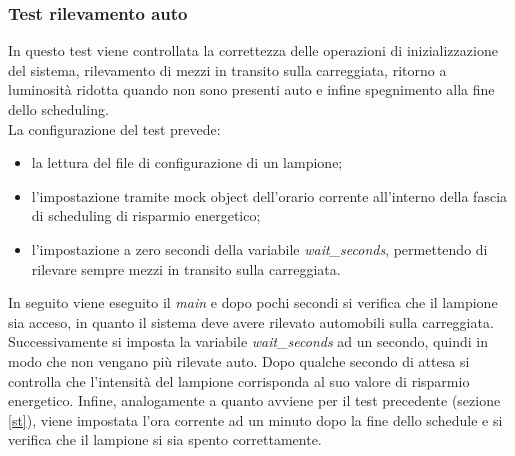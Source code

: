 \subsubsection{Test rilevamento auto}
In questo test viene controllata la correttezza delle operazioni di inizializzazione del sistema, rilevamento di mezzi in transito sulla carreggiata, ritorno a luminosità ridotta quando non sono presenti auto e infine spegnimento alla fine dello scheduling.
\\La configurazione del test prevede:
\begin{itemize}
	\item la lettura del file di configurazione di un lampione;
	\item l'impostazione tramite mock object dell'orario corrente all'interno della fascia di scheduling di risparmio energetico;
	\item l'impostazione a zero secondi della variabile \textit{wait\_seconds}, permettendo di rilevare sempre mezzi in transito sulla carreggiata.
\end{itemize}
In seguito viene eseguito il \textit{main} e dopo pochi secondi si verifica che il lampione sia acceso, in quanto il sistema deve avere rilevato automobili sulla carreggiata.
Successivamente si imposta la variabile \textit{wait\_seconds} ad un secondo, quindi in modo che non vengano più rilevate auto.
Dopo qualche secondo di attesa si controlla che l'intensità del lampione corrisponda al suo valore di risparmio energetico.
Infine, analogamente a quanto avviene per il test precedente (sezione \ref{st}), viene impostata l'ora corrente ad un minuto dopo la fine dello schedule e si verifica che il lampione si sia spento correttamente.
